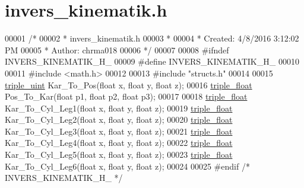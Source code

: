 \hypertarget{invers__kinematik_8h_source}{}\section{invers\+\_\+kinematik.\+h}
\label{invers__kinematik_8h_source}

\begin{DoxyCode}
00001 \textcolor{comment}{/*}
00002 \textcolor{comment}{ * invers\_kinematik.h}
00003 \textcolor{comment}{ *}
00004 \textcolor{comment}{ * Created: 4/8/2016 3:12:02 PM}
00005 \textcolor{comment}{ *  Author: chrma018}
00006 \textcolor{comment}{ */} 
00007 
00008 \textcolor{preprocessor}{#ifndef INVERS\_KINEMATIK\_H\_}
00009 \textcolor{preprocessor}{#define INVERS\_KINEMATIK\_H\_}
00010 
00011 \textcolor{preprocessor}{#include <math.h>}
00012 
00013 \textcolor{preprocessor}{#include "structs.h"}
00014 
00015 \hyperlink{structtriple__uint}{triple\_uint} Kar\_To\_Pos(\textcolor{keywordtype}{float} x, \textcolor{keywordtype}{float} y, \textcolor{keywordtype}{float} z);
00016 \hyperlink{structtriple__float}{triple\_float} Pos\_To\_Kar(\textcolor{keywordtype}{float} p1, \textcolor{keywordtype}{float} p2, \textcolor{keywordtype}{float} p3);
00017 
00018 \hyperlink{structtriple__float}{triple\_float} Kar\_To\_Cyl\_Leg1(\textcolor{keywordtype}{float} x, \textcolor{keywordtype}{float} y, \textcolor{keywordtype}{float} z);
00019 \hyperlink{structtriple__float}{triple\_float} Kar\_To\_Cyl\_Leg2(\textcolor{keywordtype}{float} x, \textcolor{keywordtype}{float} y, \textcolor{keywordtype}{float} z);
00020 \hyperlink{structtriple__float}{triple\_float} Kar\_To\_Cyl\_Leg3(\textcolor{keywordtype}{float} x, \textcolor{keywordtype}{float} y, \textcolor{keywordtype}{float} z);
00021 \hyperlink{structtriple__float}{triple\_float} Kar\_To\_Cyl\_Leg4(\textcolor{keywordtype}{float} x, \textcolor{keywordtype}{float} y, \textcolor{keywordtype}{float} z);
00022 \hyperlink{structtriple__float}{triple\_float} Kar\_To\_Cyl\_Leg5(\textcolor{keywordtype}{float} x, \textcolor{keywordtype}{float} y, \textcolor{keywordtype}{float} z);
00023 \hyperlink{structtriple__float}{triple\_float} Kar\_To\_Cyl\_Leg6(\textcolor{keywordtype}{float} x, \textcolor{keywordtype}{float} y, \textcolor{keywordtype}{float} z);
00024 
00025 \textcolor{preprocessor}{#endif }\textcolor{comment}{/* INVERS\_KINEMATIK\_H\_ */}\textcolor{preprocessor}{}
\end{DoxyCode}
